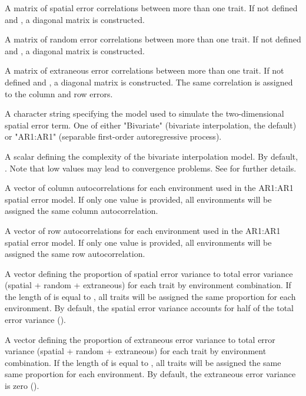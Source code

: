 \documentclass[a4paper]{book}
\begin{document}
\begin{Arguments}
\begin{ldescription}
\item[\code{S\_cor\_R}] A matrix of spatial error correlations between more than one trait. If not
defined and , a diagonal matrix is constructed.

\item[\code{R\_cor\_R}] A matrix of random error correlations between more than one trait. If not
defined and , a diagonal matrix is constructed.

\item[\code{E\_cor\_R}] A matrix of extraneous error correlations between more than one trait. If not
defined and , a diagonal matrix is constructed. The same correlation is
assigned to the column and row errors.

\item[\code{spatial\_model}] A character string specifying the model used to simulate the two-dimensional
spatial error term. One of either "Bivariate" (bivariate interpolation, the default) or "AR1:AR1"
(separable first-order autoregressive process).

\item[\code{complexity}] A scalar defining the complexity of the bivariate interpolation model.
By default, . Note that low values may lead to convergence problems.
See  for further details.

\item[\code{col\_cor}] A vector of column autocorrelations for each environment used in the AR1:AR1
spatial error model. If only one value is provided, all environments will be assigned the
same column autocorrelation.

\item[\code{row\_cor}] A vector of row autocorrelations for each environment used in the AR1:AR1
spatial error model. If only one value is provided, all environments will be assigned the
same row autocorrelation.

\item[\code{prop\_spatial}] A vector defining the proportion of spatial error variance to total error
variance (spatial + random + extraneous) for each trait by environment combination. If the
length of  is equal to , all traits will be assigned the same
proportion for each environment. By default, the spatial error variance accounts for half of
the total error variance ().

\item[\code{prop\_ext}] A vector defining the proportion of extraneous error variance to total error
variance (spatial + random + extraneous) for each trait by environment combination. If the
length of  is equal to , all traits will be assigned the same
same proportion for each environment. By default, the extraneous error variance is zero
().


\end{ldescription}
\end{Arguments}
\end{document}
